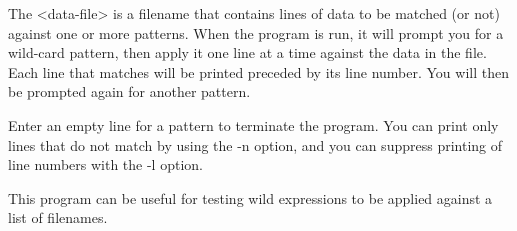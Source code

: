 The {\textless}data-file{\textgreater} is a filename that contains lines
of data to be matched (or not) against one or more patterns.
When the program is run, it will prompt you for a wild-card
pattern, then apply it one line at a time against
the data in the file. Each line that matches will be printed
preceded by its line number.  You will then be prompted again
for another pattern.

Enter an empty line for a pattern to terminate the program. You
can print only lines that do not match by using the -n option,
and you can suppress printing of line numbers with the -l option.

This program can be useful for testing wild expressions to be
applied against a list of filenames.

%
%
%
%
%
